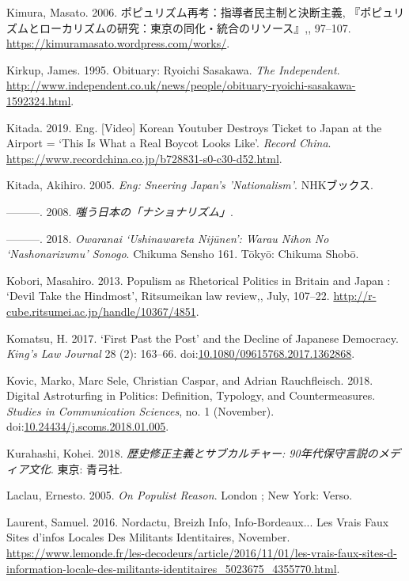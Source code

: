 \documentclass[10pt,british,A4paper,,openany]{memoir}
\begin{document}
\hypertarget{ref-kimura__2006}{}
Kimura, Masato. 2006. ポピュリズム再考：指導者民主制と決断主義,
『ポピュリズムとローカリズムの研究：東京の同化・統合のリソース』,,
97--107. \url{https://kimuramasato.wordpress.com/works/}.

\hypertarget{ref-kirkup_obituary:_1995}{}
Kirkup, James. 1995. Obituary: Ryoichi Sasakawa. \emph{The Independent}.
\url{http://www.independent.co.uk/news/people/obituary-ryoichi-sasakawa-1592324.html}.

\hypertarget{ref-kitada_eng._2019}{}
Kitada. 2019. Eng. {[}Video{]} Korean Youtuber Destroys Ticket to Japan
at the Airport = `This Is What a Real Boycot Looks Like'. \emph{Record
China}. \url{https://www.recordchina.co.jp/b728831-s0-c30-d52.html}.

\hypertarget{ref-kitada_eng:_2005}{}
Kitada, Akihiro. 2005. \emph{Eng: Sneering Japan's 'Nationalism'}.
NHKブックス.

\hypertarget{ref-kitada__2008}{}
---------. 2008. \emph{嗤う日本の「ナショナリズム」}.

\hypertarget{ref-kitada_owaranai_2018}{}
---------. 2018. \emph{Owaranai `Ushinawareta Nijūnen': Warau Nihon No
`Nashonarizumu' Sonogo}. Chikuma Sensho 161. Tōkyō: Chikuma Shobō.

\hypertarget{ref-kobori_populism_2013}{}
Kobori, Masahiro. 2013. Populism as Rhetorical Politics in Britain and
Japan : `Devil Take the Hindmost', Ritsumeikan law review,, July,
107--22. \url{http://r-cube.ritsumei.ac.jp/handle/10367/4851}.

\hypertarget{ref-komatsu_first_2017}{}
Komatsu, H. 2017. `First Past the Post' and the Decline of Japanese
Democracy. \emph{King's Law Journal} 28 (2): 163--66.
doi:\href{https://doi.org/10.1080/09615768.2017.1362868}{10.1080/09615768.2017.1362868}.

\hypertarget{ref-kovic_digital_2018}{}
Kovic, Marko, Marc Sele, Christian Caspar, and Adrian Rauchfleisch.
2018. Digital Astroturfing in Politics: Definition, Typology, and
Countermeasures. \emph{Studies in Communication Sciences}, no. 1
(November).
doi:\href{https://doi.org/10.24434/j.scoms.2018.01.005}{10.24434/j.scoms.2018.01.005}.

\hypertarget{ref-kurahashi_:_2018}{}
Kurahashi, Kohei. 2018. \emph{歴史修正主義とサブカルチャー:
90年代保守言説のメディア文化}. 東京: 青弓社.

\hypertarget{ref-laclau_populist_2005}{}
Laclau, Ernesto. 2005. \emph{On Populist Reason}. London ; New York:
Verso.

\hypertarget{ref-laurent_nordactu_2016}{}
Laurent, Samuel. 2016. Nordactu, Breizh Info, Info-Bordeaux... Les Vrais
Faux Sites d'infos Locales Des Militants Identitaires, November.
\url{https://www.lemonde.fr/les-decodeurs/article/2016/11/01/les-vrais-faux-sites-d-information-locale-des-militants-identitaires_5023675_4355770.html}.
\end{document}
